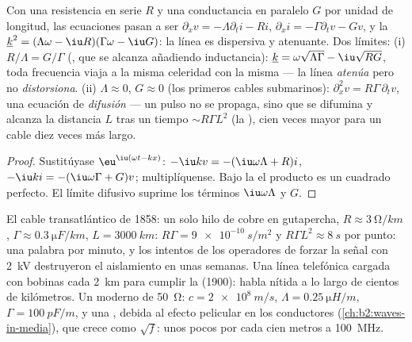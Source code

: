 \begin{proposition}\label{prop:b2:dispersion-wave-packets:lossy}
Con una resistencia en serie $R$ y una conductancia en paralelo $G$ por
unidad de longitud, las ecuaciones pasan a ser $\partial_xv = -\Lambda\partial_ti - Ri$, $\partial_xi =
-\Gamma\partial_tv - Gv$, y la  $\underline k^2 = (\Lambda\omega -
\iu R)(\Gamma\omega - \iu G)$: la línea es dispersiva y atenuante. Dos
límites: (i) $R/\Lambda = G/\Gamma$ (, que se alcanza
añadiendo inductancia): $\underline k = \omega\sqrt{\Lambda\Gamma} - \iu\sqrt{RG}$, toda
frecuencia viaja a la misma celeridad con la misma  --- la línea
\emph{atenúa} pero no \emph{distorsiona}. (ii) $\Lambda \approx 0$, $G \approx 0$
(los primeros cables submarinos): $\partial_x^2v = R\Gamma\,\partial_tv$, una
ecuación de \emph{difusión} --- un pulso no se propaga, sino que se
difumina y alcanza la distancia $L$ tras un tiempo $\sim R\Gamma L^2$ (la ), cien veces mayor para un cable diez veces más largo.
\end{proposition}

\begin{proof}
Sustitúyase $\eu^{\iu(\omega t - kx)}$: $-\iu kv = -(\iu\omega\Lambda + R)i$, $-\iu ki = -(\iu
\omega\Gamma + G)v$; multiplíquense. Bajo la  el producto
es un cuadrado perfecto. El límite difusivo suprime los términos $\iu\omega\Lambda$ y $G$.
\end{proof}

\begin{example}\label{ex:b2:dispersion-wave-packets:cables}
El cable transatlántico de 1858: un solo hilo de cobre en gutapercha,
$R \approx \qty{3}{\ohm/km}$, $\Gamma \approx \qty{0.3}{\micro F/km}$, $L = \qty{3000}{km}$:
$R\Gamma = \qty{9e-10}{s/m^2}$ y $R\Gamma L^2 \approx \qty{8}{s}$ por punto: una palabra
por minuto, y los intentos de los operadores de forzar la señal
con \qty{2}{kV} destruyeron el aislamiento en unas semanas. Una línea
telefónica cargada con bobinas cada \qty{2}{km} para cumplir la  (1900): habla nítida a lo largo de cientos de kilómetros. Un  moderno de \qty{50}{\ohm}: $c = \qty{2e8}{m/s}$, $\Lambda = \qty{0.25}{\micro H/m}$, $\Gamma =
\qty{100}{pF/m}$, y una , debida al efecto pelicular en los
conductores (\cref{ch:b2:waves-in-media}), que crece como $\sqrt f$: unos
pocos  por cada cien metros a \qty{100}{MHz}.
\end{example}

